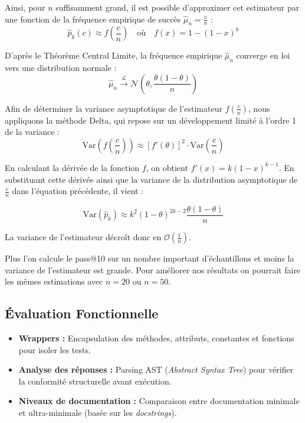 \documentclass[11pt, a4paper]{article}
\begin{document}
Ainsi, pour $n$ suffisamment grand, il est possible d'approximer cet estimateur par une fonction de la fréquence empirique de succès $\hat{\mu}_n = \frac{c}{n}$ :
\begin{equation}
    \hat{p}_k(c) \approx f\left(\frac{c}{n}\right) \quad \text{où} \quad f(x) = 1 - (1-x)^k
\end{equation}

D'après le Théorème Central Limite, la fréquence empirique $\hat{\mu}_n$ converge en loi vers une distribution normale :
\begin{equation}
    \hat{\mu}_n \xrightarrow{\mathcal{L}} \mathcal{N}\left(\theta, \frac{\theta(1-\theta)}{n}\right)
\end{equation}

Afin de déterminer la variance asymptotique de l'estimateur $f\left(\frac{c}{n}\right)$, nous appliquons la méthode Delta, qui repose sur un développement limité à l'ordre 1 de la variance :
\begin{equation}
    \text{Var}\left(f\left(\frac{c}{n}\right)\right) \approx \left[f'(\theta)\right]^2 \cdot \text{Var}\left(\frac{c}{n}\right)
\end{equation}

En calculant la dérivée de la fonction $f$, on obtient $f'(x) = k(1-x)^{k-1}$. En substituant cette dérivée ainsi que la variance de la distribution asymptotique de $\frac{c}{n}$ dans l'équation précédente, il vient :

\begin{equation}
    \text{Var}(\hat{p}_k) \approx k^2 (1-\theta)^{2k-2} \frac{\theta(1-\theta)}{n}
\end{equation}

La variance de l'estimateur décroît donc en $\mathcal{O}\left(\frac{1}{n}\right)$. 

Plus l'on calcule le pass@10 sur un nombre important d'échantillons et moins la variance de l'estimateur est grande. Pour améliorer nos résultats on pourrait faire les mêmes estimations avec $n = 20$ ou $n = 50$.


\subsection{Évaluation Fonctionnelle}
\begin{itemize}
    \item \textbf{Wrappers :} Encapsulation des méthodes, attributs, constantes et fonctions pour isoler les tests.
    \item \textbf{Analyse des réponses :} Parsing AST (\textit{Abstract Syntax Tree}) pour vérifier la conformité structurelle avant exécution.
    \item \textbf{Niveaux de documentation :} Comparaison entre documentation minimale et ultra-minimale (basée sur les \textit{docstrings}).
\end{itemize}
\end{document}
